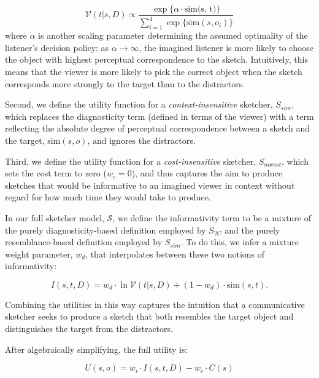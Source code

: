 \documentclass[9pt,twocolumn,twoside]{pnas-new}
\begin{document}
\begin{equation} \label{literal_viewer_score}
\mathcal{V}(t|s,D) \propto \frac {\exp\{\alpha \cdot \textrm{sim(s, t)}\}} {\sum_{i=1}^{4} \exp\{\textrm{sim}(s,o_i)\}}
\end{equation}
where $\alpha$ is another scaling parameter determining the assumed optimality of the listener's decision policy: as $\alpha \rightarrow \infty$, the imagined listener is more likely to choose the object with highest perceptual correspondence to the sketch. Intuitively, this means that the viewer is more likely to pick the correct object when the sketch corresponds more strongly to the target than to the distractors. 

Second, we define the utility function for a \textit{context-insensitive} sketcher, $S_{sim}$, which replaces the diagnosticity term (defined in terms of the viewer) with a  term reflecting the absolute degree of perceptual correspondence between a sketch and the target, $\textrm{sim}(s,o)$, and ignores the distractors. 

Third, we define the utility function for a \textit{cost-insensitive} sketcher, $S_{nocost}$, which sets the cost term to zero ($w_c=0$), and thus captures the aim to produce sketches that would be informative to an imagined viewer in context without regard for how much time they would take to produce. 

In our full sketcher model, $\mathcal{S}$, we define the informativity term to be a mixture of the purely diagnosticity-based definition employed by $S_{2C}$ and the purely resemblance-based definition employed by $S_{sim}$. 
To do this, we infer a mixture weight parameter, $w_{d}$, that interpolates between these two notions of informativity: 

\begin{equation} \label{prag_interpolation}
I(s,t,D) = w_{d} \cdot \ln \mathcal{V}(t|s,D) + (1-w_{d}) \cdot \textrm{sim}(s,t). 
\end{equation} 

Combining the utilities in this way captures the intuition that a communicative sketcher seeks to produce a sketch that both resembles the target object and distinguishes the target from the distractors.

After algebraically simplifying, the full utility is:

\begin{equation}
U(s,o) =  w_i \cdot  I(s,t,D) - w_c \cdot C(s)
\end{equation}
\end{document}
